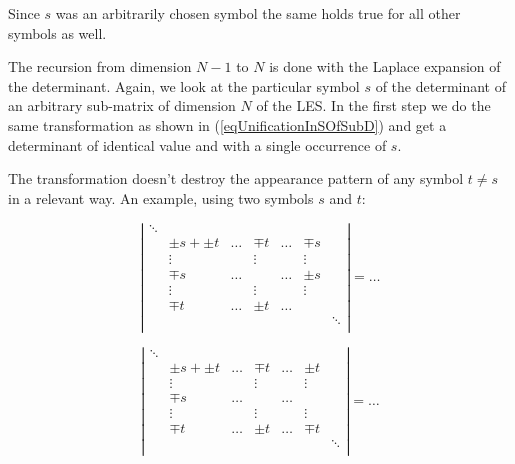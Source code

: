 Since $s$ was an arbitrarily chosen symbol the same holds true for all
other symbols as well.

The recursion from dimension $N-1$ to $N$ is done with the Laplace
expansion of the determinant. Again, we look at the particular symbol $s$
of the determinant of an arbitrary sub-matrix of dimension $N$ of the LES.
In the first step we do the same transformation as shown in
(\ref{eqUnificationInSOfSubD}) and get a determinant of identical value
and with a single occurrence of $s$.

The transformation doesn't destroy the appearance pattern of any symbol $t
\not= s$ in a relevant way. An example, using two symbols $s$ and $t$:

\begin{displaymath}
\left|
\begin{array}{ccccccc}
\ddots &               &        &        &        &        &        \\
       & \pm s + \pm t & \ldots & \mp t  & \ldots & \mp s  &        \\
       & \vdots        &        & \vdots &        & \vdots &        \\
       & \mp s         & \ldots &        & \ldots & \pm s  &        \\
       & \vdots        &        & \vdots &        & \vdots &        \\
       &         \mp t & \ldots & \pm t  & \ldots &        &        \\
       &               &        &        &        &        & \ddots \\
\end{array}
\right| = \ldots
\end{displaymath}

\begin{displaymath}
\left|
\begin{array}{ccccccc}
\ddots &               &        &        &        &        &        \\
       & \pm s + \pm t & \ldots & \mp t  & \ldots & \pm t  &        \\
       & \vdots        &        & \vdots &        & \vdots &        \\
       & \mp s         & \ldots &        & \ldots &        &        \\
       & \vdots        &        & \vdots &        & \vdots &        \\
       &         \mp t & \ldots & \pm t  & \ldots & \mp t  &        \\
       &               &        &        &        &        & \ddots \\
\end{array}
\right| = \ldots
\end{displaymath}

